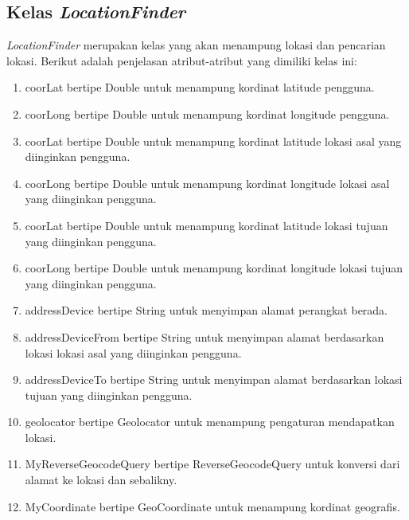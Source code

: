 \subsection{Kelas \textit{LocationFinder}}
\label{lab:Kelas LocationFinder}
\hspace{0.5cm} \textit{LocationFinder} merupakan kelas yang akan menampung lokasi dan pencarian lokasi. Berikut adalah penjelasan atribut-atribut yang dimiliki kelas ini:
\begin{enumerate}
	\item coorLat bertipe Double untuk menampung kordinat latitude pengguna.
	\item coorLong bertipe Double untuk menampung kordinat longitude pengguna.
	\item coorLat bertipe Double untuk menampung kordinat latitude lokasi asal yang diinginkan pengguna.
	\item coorLong bertipe Double untuk menampung kordinat longitude lokasi asal yang diinginkan pengguna.
	\item coorLat bertipe Double untuk menampung kordinat latitude lokasi tujuan yang diinginkan pengguna.
	\item coorLong bertipe Double untuk menampung kordinat longitude lokasi tujuan yang diinginkan pengguna.
	
	\item addressDevice bertipe String untuk menyimpan alamat perangkat berada.
	\item addressDeviceFrom bertipe String untuk menyimpan alamat berdasarkan lokasi lokasi asal yang diinginkan pengguna.
	\item addressDeviceTo bertipe String untuk menyimpan alamat berdasarkan lokasi tujuan yang diinginkan pengguna.
	
	\item geolocator bertipe Geolocator untuk menampung pengaturan mendapatkan lokasi.
	\item MyReverseGeocodeQuery bertipe ReverseGeocodeQuery untuk konversi dari alamat ke lokasi dan sebalikny.
	\item MyCoordinate bertipe GeoCoordinate untuk menampung kordinat geografis.
\end{enumerate}

